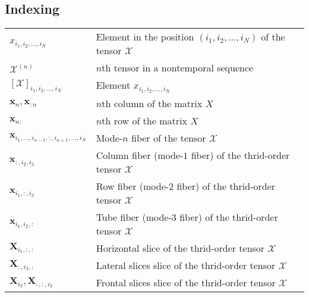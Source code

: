 \documentclass{article}
\begin{document}
\subsection{Indexing}
\begin{xltabular}[l]{\linewidth}{XX}
    \(x_{i_1,i_2, \dots, i_N}\) & Element in the position \((i_1,i_2, \dots, i_N)\) of the tensor \(\bm{\mathcal{X}}\)\\
    \(\bm{\mathcal{X}}^{(n)}\) & \(n\)th tensor in a nontemporal sequence\\
    \(\left[ \bm{\mathcal{X}} \right]_{i_1,i_2, \dots, i_N}\) & Element \(x_{i_1,i_2, \dots, i_N}\)\\
    \(\mathbf{x}_{n}, \mathbf{x}_{:n}\) & \(n\)th column of the matrix \(X\)\\
    \(\mathbf{x}_{n:}\) & \(n\)th row of the matrix \(X\)\\
    \(\mathbf{x}_{i_1,\dots,i_{n-1}, :, i_{n+1},\dots, i_N}\) & Mode-\(n\) fiber of the tensor \(\bm{\mathcal{X}}\)\\
    \(\mathbf{x}_{:,i_2,i_3}\) & Column fiber (mode-\(1\) fiber) of the thrid-order tensor \(\bm{\mathcal{X}}\)\\
    \(\mathbf{x}_{i_1,:,i_3}\) & Row fiber (mode-\(2\) fiber) of the thrid-order tensor \(\bm{\mathcal{X}}\)\\
    \(\mathbf{x}_{i_1,i_2,:}\) & Tube fiber (mode-\(3\) fiber) of the thrid-order tensor \(\bm{\mathcal{X}}\)\\
    \(\mathbf{X}_{i_1,:,:}\) & Horizontal slice of the thrid-order tensor \(\bm{\mathcal{X}}\)\\
    \(\mathbf{X}_{:,i_2,:}\) & Lateral slices slice of the thrid-order tensor \(\bm{\mathcal{X}}\)\\
    \(\mathbf{X}_{i_3}, \mathbf{X}_{:,:,i_3}\) & Frontal slices slice of the thrid-order tensor \(\bm{\mathcal{X}}\)
\end{xltabular}
\end{document}
